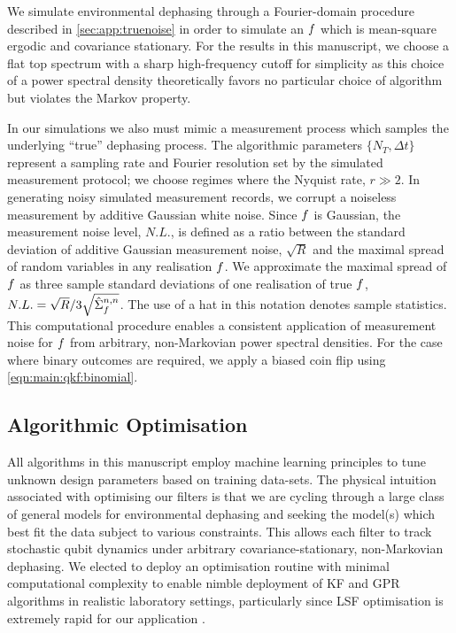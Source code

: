 We simulate environmental dephasing through a Fourier-domain procedure described in \cref{sec:app:truenoise} \cite{soare2014} in order to simulate an $f$ which is mean-square ergodic and covariance stationary.  For the results in this manuscript, we choose a flat top spectrum with a sharp high-frequency cutoff for simplicity as this choice of a power spectral density theoretically favors no particular choice of algorithm but violates the Markov property. 

In our simulations we also must mimic a measurement process which samples the underlying ``true'' dephasing process.  The algorithmic parameters $\{N_T, \Delta t\} $ represent a sampling rate and Fourier resolution set by the simulated measurement protocol; we choose regimes where the Nyquist rate, $r \gg 2$. In generating noisy simulated measurement records, we corrupt a noiseless measurement by additive Gaussian white noise. Since $f$ is Gaussian, the measurement noise level, $N.L.$, is defined as a ratio between the standard deviation of additive Gaussian measurement noise, $\sqrt{R}$ and the maximal spread of random variables in any realisation $f$. We approximate the maximal spread of $f$ as three sample standard deviations of one realisation of true $f$, $N.L. = \sqrt{R}/3\sqrt{\hat{\Sigma}_f^{n,n}}$. The use of a hat in this notation denotes sample statistics. This computational procedure enables a consistent application of measurement noise for $f$ from arbitrary, non-Markovian power spectral densities. For the case where binary outcomes are required, we apply a biased coin flip using \cref{eqn:main:qkf:binomial}.

\subsection{Algorithmic Optimisation \label{sec:main:Optimisation}}

All algorithms in this manuscript employ machine learning principles to tune unknown design parameters based on training data-sets. The physical intuition associated with optimising our filters is that we are cycling through a large class of general models for environmental dephasing and seeking the model(s) which best fit the data subject to various constraints. This allows each filter to track stochastic qubit dynamics under arbitrary covariance-stationary, non-Markovian dephasing.  We elected to deploy an optimisation routine with minimal computational complexity to enable nimble deployment of KF and GPR algorithms in realistic laboratory settings, particularly since LSF optimisation is extremely rapid for our application \cite{mavadia2017}. 

